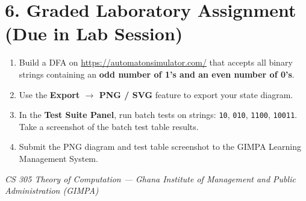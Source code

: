 \documentclass[11pt,a4paper]{article}
\begin{document}
\section*{6. Graded Laboratory Assignment (Due in Lab Session)}
\begin{tcolorbox}[colback=white, colframe=gimpaaccent, title=\textbf{Student Submission Tasks}]
\begin{enumerate}[leftmargin=1.5em, itemsep=3pt]
    \item Build a DFA on \url{https://automatonsimulator.com/} that accepts all binary strings containing an \textbf{odd number of 1's and an even number of 0's}.
    \item Use the \textbf{Export $\to$ PNG / SVG} feature to export your state diagram.
    \item In the \textbf{Test Suite Panel}, run batch tests on strings: \texttt{10}, \texttt{010}, \texttt{1100}, \texttt{10011}. Take a screenshot of the batch test table results.
    \item Submit the PNG diagram and test table screenshot to the GIMPA Learning Management System.
\end{enumerate}
\end{tcolorbox}

\vfill
\begin{center}
    \small\color{darkgray}
    \textit{CS 305 Theory of Computation --- Ghana Institute of Management and Public Administration (GIMPA)}
\end{center}
\end{document}
